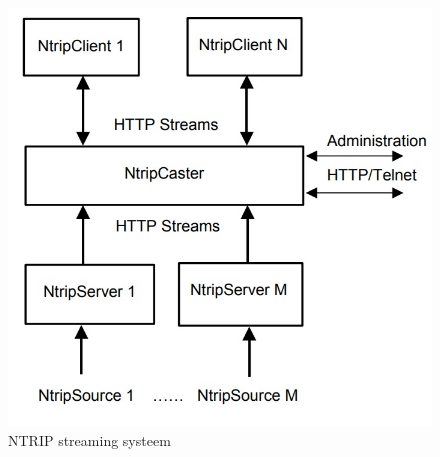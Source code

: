 \begin{figure}[hpb]
	\includegraphics[scale=0.65]{NTRIP.jpg}
	\caption{NTRIP streaming systeem \cite{LBibNTRIP}}
	\label{imgNTRIP}
\end{figure} 
 



